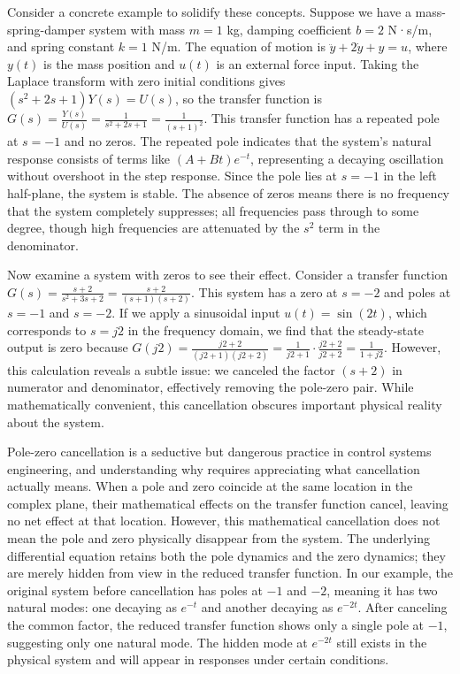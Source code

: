 Consider a concrete example to solidify these concepts. Suppose we have a mass-spring-damper system with mass $m = 1$ kg, damping coefficient $b = 2$ N·s/m, and spring constant $k = 1$ N/m. The equation of motion is $\ddot{y} + 2\dot{y} + y = u$, where $y(t)$ is the mass position and $u(t)$ is an external force input. Taking the Laplace transform with zero initial conditions gives $(s^2 + 2s + 1)Y(s) = U(s)$, so the transfer function is $G(s) = \frac{Y(s)}{U(s)} = \frac{1}{s^2 + 2s + 1} = \frac{1}{(s+1)^2}$. This transfer function has a repeated pole at $s = -1$ and no zeros. The repeated pole indicates that the system's natural response consists of terms like $(A + Bt)e^{-t}$, representing a decaying oscillation without overshoot in the step response. Since the pole lies at $s = -1$ in the left half-plane, the system is stable. The absence of zeros means there is no frequency that the system completely suppresses; all frequencies pass through to some degree, though high frequencies are attenuated by the $s^2$ term in the denominator.

Now examine a system with zeros to see their effect. Consider a transfer function $G(s) = \frac{s+2}{s^2 + 3s + 2} = \frac{s+2}{(s+1)(s+2)}$. This system has a zero at $s = -2$ and poles at $s = -1$ and $s = -2$. If we apply a sinusoidal input $u(t) = \sin(2t)$, which corresponds to $s = j2$ in the frequency domain, we find that the steady-state output is zero because $G(j2) = \frac{j2+2}{(j2+1)(j2+2)} = \frac{1}{j2+1} \cdot \frac{j2+2}{j2+2} = \frac{1}{1+j2}$. However, this calculation reveals a subtle issue: we canceled the factor $(s+2)$ in numerator and denominator, effectively removing the pole-zero pair. While mathematically convenient, this cancellation obscures important physical reality about the system.

Pole-zero cancellation is a seductive but dangerous practice in control systems engineering, and understanding why requires appreciating what cancellation actually means. When a pole and zero coincide at the same location in the complex plane, their mathematical effects on the transfer function cancel, leaving no net effect at that location. However, this mathematical cancellation does not mean the pole and zero physically disappear from the system. The underlying differential equation retains both the pole dynamics and the zero dynamics; they are merely hidden from view in the reduced transfer function. In our example, the original system before cancellation has poles at $-1$ and $-2$, meaning it has two natural modes: one decaying as $e^{-t}$ and another decaying as $e^{-2t}$. After canceling the common factor, the reduced transfer function shows only a single pole at $-1$, suggesting only one natural mode. The hidden mode at $e^{-2t}$ still exists in the physical system and will appear in responses under certain conditions.

